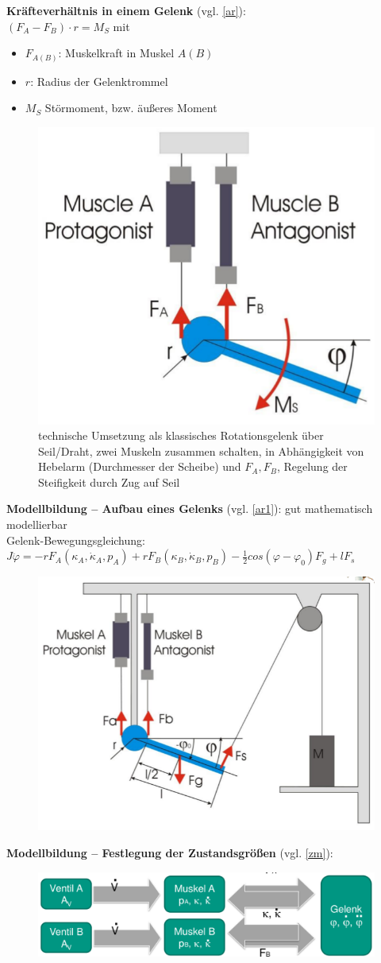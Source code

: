 \newpage
\noindent
\textbf{Kräfteverhältnis in einem Gelenk} (vgl. \autoref{ar}):\\
$(F_A - F_B)\cdot r = M_S$ mit
\begin{itemize}
\item $F_{A(B)}$: Muskelkraft in Muskel $A(B)$
\item $r$: Radius der Gelenktrommel
\item $M_S$ Störmoment, bzw. äußeres Moment
\end{itemize}
\begin{figure}[h!]
	\centering
	\includegraphics[width=0.4\linewidth]{figures/ch03_antagonistische-regelung.png}
	\caption{technische Umsetzung als klassisches Rotationsgelenk über Seil/Draht, zwei Muskeln zusammen schalten, in Abhängigkeit von Hebelarm (Durchmesser der Scheibe)
und $F_A, F_B$,  Regelung der Steifigkeit durch Zug auf Seil}
	\label{ar}
\end{figure}
\textbf{Modellbildung -- Aufbau eines Gelenks} (vgl. \autoref{ar1}): gut mathematisch modellierbar\\
Gelenk-Bewegungsgleichung: $J\ddot{\varphi} = -rF_{A}(\kappa_A, \dot{\kappa}_A, p_A)+rF_B(\kappa_B, \dot{\kappa}_B, p_B)-\frac{1}{2}cos(\varphi - \varphi_0)F_g+lF_s$
\begin{figure}[h!]
	\centering
	\includegraphics[width=0.4\linewidth]{figures/ch03_antagonistische-regelung1.png}
	\caption{}
	\label{ar1}
\end{figure}
\newpage
\textbf{Modellbildung -- Festlegung der Zustandsgrößen} (vgl. \autoref{zm}): 
\begin{figure}[h!]
	\centering
	\includegraphics[width=0.4\linewidth]{figures/ch03_zwei-muskeln.png}
	\caption{}
	\label{zm}
\end{figure}
